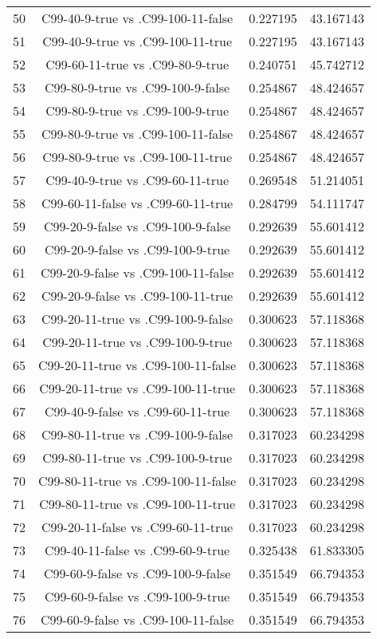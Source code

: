 \documentclass[a4paper,10pt]{article}
\begin{document}
\begin{landscape}
\begin{table}[!htp]
\begin{tabular}{cccc}
50&C99-40-9-true vs .C99-100-11-false&0.227195&43.167143\\
51&C99-40-9-true vs .C99-100-11-true&0.227195&43.167143\\
52&C99-60-11-true vs .C99-80-9-true&0.240751&45.742712\\
53&C99-80-9-true vs .C99-100-9-false&0.254867&48.424657\\
54&C99-80-9-true vs .C99-100-9-true&0.254867&48.424657\\
55&C99-80-9-true vs .C99-100-11-false&0.254867&48.424657\\
56&C99-80-9-true vs .C99-100-11-true&0.254867&48.424657\\
57&C99-40-9-true vs .C99-60-11-true&0.269548&51.214051\\
58&C99-60-11-false vs .C99-60-11-true&0.284799&54.111747\\
59&C99-20-9-false vs .C99-100-9-false&0.292639&55.601412\\
60&C99-20-9-false vs .C99-100-9-true&0.292639&55.601412\\
61&C99-20-9-false vs .C99-100-11-false&0.292639&55.601412\\
62&C99-20-9-false vs .C99-100-11-true&0.292639&55.601412\\
63&C99-20-11-true vs .C99-100-9-false&0.300623&57.118368\\
64&C99-20-11-true vs .C99-100-9-true&0.300623&57.118368\\
65&C99-20-11-true vs .C99-100-11-false&0.300623&57.118368\\
66&C99-20-11-true vs .C99-100-11-true&0.300623&57.118368\\
67&C99-40-9-false vs .C99-60-11-true&0.300623&57.118368\\
68&C99-80-11-true vs .C99-100-9-false&0.317023&60.234298\\
69&C99-80-11-true vs .C99-100-9-true&0.317023&60.234298\\
70&C99-80-11-true vs .C99-100-11-false&0.317023&60.234298\\
71&C99-80-11-true vs .C99-100-11-true&0.317023&60.234298\\
72&C99-20-11-false vs .C99-60-11-true&0.317023&60.234298\\
73&C99-40-11-false vs .C99-60-9-true&0.325438&61.833305\\
74&C99-60-9-false vs .C99-100-9-false&0.351549&66.794353\\
75&C99-60-9-false vs .C99-100-9-true&0.351549&66.794353\\
76&C99-60-9-false vs .C99-100-11-false&0.351549&66.794353\\

\end{tabular}
\end{table}
\end{landscape}
\end{document}
